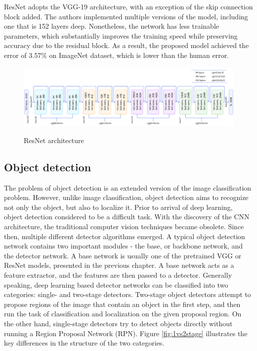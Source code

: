 \documentclass[english, 12pt, a4paper, elec, utf8, a-1b, online]{aaltothesis}
\begin{document}
ResNet adopts the VGG-19 architecture, with an exception of the skip connection block added. The authors implemented multiple versions of the model, including one that is 152 layers deep. Nonetheless, the network has less trainable parameters, which substantially improves the training speed while preserving accuracy due to the residual block. As a result, the proposed model achieved the error of 3.57\% on ImageNet dataset, which is lower than the human error. \cite{He2015}

\begin{figure}[htb]
	\begin{center}
		\includegraphics[width=16cm]{./resnetFull.png}
	\end{center}
	\caption{ResNet architecture\cite{resnet50}}
	\begin{center}
		\label{resnetFull}
	\end{center}
\end{figure}
\FloatBarrier




\subsection{Object detection}
\label{obj_detection_section} 
The problem of object detection is an extended version of the image classification problem. However, unlike image classification, object detection aims to recognize not only the object, but also to localize it. Prior to arrival of deep learning, object detection considered to be a difficult task. With the discovery of the CNN architecture, the traditional computer vision techniques became obsolete. Since then, multiple different detector algorithms emerged. A typical object detection network contains two important modules - the base, or backbone network, and the detector network. A base network is usually one of the pretrained VGG or ResNet models, presented in the previous chapter. A base network acts as a feature extractor, and the features are then passed to a detector. Generally speaking, deep learning based detector networks can be classified into two categories: single- and two-stage detectors. \cite{Zaidi2021} Two-stage object detectors attempt to propose regions of the image that contain an object in the first step, and then run the task of classification and localization on the given proposal region. On the other hand, single-stage detectors try to detect objects directly without running a Region Proposal Network (RPN). Figure \ref{fig:1vs2stage} illustrates the key differences in the structure of the two categories. 
\end{document}

